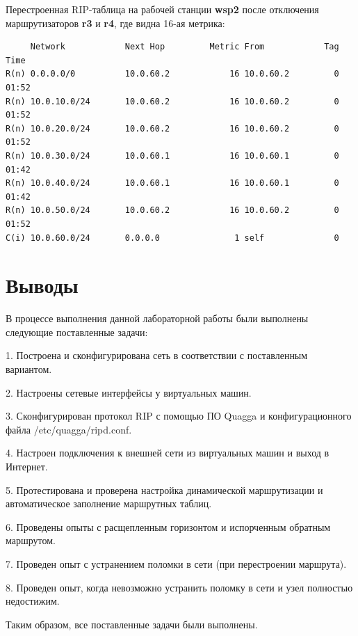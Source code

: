 \documentclass[a4paper,12pt]{article}
\begin{document}
Перестроенная RIP-таблица на рабочей станции \textbf{wsp2} после отключения маршрутизаторов \textbf{r3} и \textbf{r4}, где видна 16-ая метрика:

\begin{Verbatim}
     Network            Next Hop         Metric From            Tag Time
R(n) 0.0.0.0/0          10.0.60.2            16 10.0.60.2         0 01:52
R(n) 10.0.10.0/24       10.0.60.2            16 10.0.60.2         0 01:52
R(n) 10.0.20.0/24       10.0.60.2            16 10.0.60.2         0 01:52
R(n) 10.0.30.0/24       10.0.60.1            16 10.0.60.1         0 01:42
R(n) 10.0.40.0/24       10.0.60.1            16 10.0.60.1         0 01:42
R(n) 10.0.50.0/24       10.0.60.2            16 10.0.60.2         0 01:52
C(i) 10.0.60.0/24       0.0.0.0               1 self              0
\end{Verbatim}

\section{Выводы}

В процессе выполнения данной лабораторной работы были выполнены следующие поставленные задачи:

1. Построена и сконфигурирована сеть в соответствии с поставленным вариантом.

2. Настроены сетевые интерфейсы у виртуальных машин.

3. Сконфигурирован протокол RIP с помощью ПО Quagga и конфигурационного файла /etc/quagga/ripd.conf.

4. Настроен подключения к внешней сети из виртуальных машин и выход в Интернет.

5. Протестирована и проверена настройка динамической маршрутизации и автоматическое заполнение маршрутных таблиц.

6. Проведены опыты с расщепленным горизонтом и испорченным обратным маршрутом.

7. Проведен опыт с устранением поломки в сети (при перестроении маршрута).

8. Проведен опыт, когда невозможно устранить поломку в сети и узел полностью недостижим.

Таким образом, все поставленные задачи были выполнены.
\end{document}
